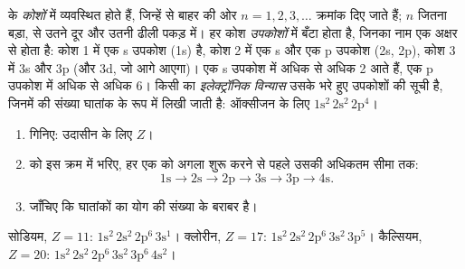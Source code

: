 \begin{definition}[कोश, उपकोश और इलेक्ट्रॉनिक विन्यास]\label{def:g10:electron-shells:configuration}
 के  \emph{कोशों} में व्यवस्थित होते हैं,
जिन्हें  से बाहर की ओर $n = 1, 2, 3, \ldots$ क्रमांक दिए जाते हैं; $n$
जितना बड़ा,   से उतने दूर और उतनी ढीली पकड़ में। हर कोश
\emph{उपकोशों} में बँटा होता है,
जिनका नाम एक अक्षर से होता है: कोश 1 में एक s उपकोश (1s) है, कोश 2 में एक s और
एक p उपकोश (2s, 2p), कोश 3 में 3s और 3p (और 3d, जो आगे आएगा)। एक s
उपकोश में अधिक से अधिक 2  आते हैं, एक p उपकोश में अधिक से अधिक 6।
किसी  का \emph{इलेक्ट्रॉनिक विन्यास}
उसके भरे हुए उपकोशों की सूची है, जिनमें  की संख्या घातांक के रूप में
लिखी जाती है: ऑक्सीजन के लिए $1\mathrm{s}^2\,2\mathrm{s}^2\,2\mathrm{p}^4$।
\end{definition}

\begin{method}[इलेक्ट्रॉनिक विन्यास लिखना, $Z = 20$ तक]\label{met:g10:electron-shells:write}
\begin{enumerate}
  \item {} गिनिए: उदासीन  के लिए $Z$।
  \item {} को इस क्रम में भरिए, हर एक को अगला शुरू करने से पहले उसकी
        अधिकतम सीमा तक:
        \[
          1\mathrm{s} \to 2\mathrm{s} \to 2\mathrm{p} \to 3\mathrm{s} \to
          3\mathrm{p} \to 4\mathrm{s}.
        \]
  \item जाँचिए कि घातांकों का योग  की संख्या के बराबर है।
\end{enumerate}
सोडियम, $Z = 11$: $1\mathrm{s}^2\,2\mathrm{s}^2\,2\mathrm{p}^6\,3\mathrm{s}^1$।
क्लोरीन, $Z = 17$: $1\mathrm{s}^2\,2\mathrm{s}^2\,2\mathrm{p}^6\,3\mathrm{s}^2\,3\mathrm{p}^5$।
कैल्सियम, $Z = 20$: $1\mathrm{s}^2\,2\mathrm{s}^2\,2\mathrm{p}^6\,3\mathrm{s}^2\,3\mathrm{p}^6\,4\mathrm{s}^2$।
\end{method}

